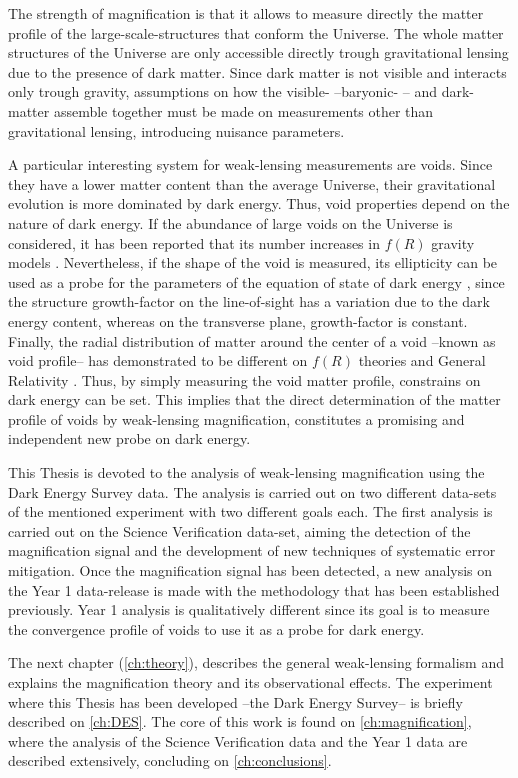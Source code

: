 The strength of magnification is that it allows to measure directly the matter profile of the large-scale-structures that conform the Universe. The whole matter structures of the Universe are only accessible directly trough gravitational lensing due to the presence of dark matter. Since dark matter is not visible and interacts only trough gravity, assumptions on how the visible- --baryonic- -- and dark- matter assemble together must be made on measurements other than gravitational lensing, introducing nuisance parameters.
\newline

A particular interesting system for weak-lensing measurements are voids. Since they have a lower matter content than the average Universe, their gravitational evolution is more dominated by dark energy. Thus, void properties depend on the nature of dark energy. If the abundance of large voids on the Universe is considered, it has been reported that its number increases in $f(R)$ gravity models \cite{2012MNRAS.421.3481L,2017JCAP...03..012V}. Nevertheless, if the shape of the void is measured, its ellipticity can be used as a probe for the parameters of the equation of state of dark energy \cite{2010MNRAS.403.1392L,0004-637X-754-2-109,PhysRevLett.98.081301,2013PhRvL.111x1103S}, since the structure growth-factor on the line-of-sight has a variation due to
the dark energy content, whereas on the transverse plane, growth-factor is constant. Finally, the radial distribution of matter around the center of a void --known as void profile-- has demonstrated to be different on $f(R)$ theories and General Relativity \cite{2014APh....54...44A,2014arXiv1410.8355C,2015MNRAS.451.4215Z,2015JCAP...08..028B,2016PhRvD..93j3522A,2016PhRvD..94j3524A}. Thus, by simply measuring the void matter profile, constrains on dark energy can be set. This implies that the direct determination of the matter profile of voids by weak-lensing magnification, constitutes a promising and independent new probe on dark energy.
\newline

This Thesis is devoted to the analysis of weak-lensing magnification using the Dark Energy Survey data. The analysis is carried out on two different data-sets of the mentioned experiment with two different goals each. The first analysis is carried out on the Science Verification data-set, aiming the detection of the magnification signal and the development of new techniques of systematic error mitigation. Once the magnification signal has been detected, a new analysis on the Year 1 data-release is made with the methodology that has been established previously. Year 1 analysis is qualitatively different since its goal is to measure the convergence profile of voids to use it as a probe for dark energy.
\newline

The next chapter (\autoref{ch:theory}), describes the general weak-lensing formalism and explains the magnification theory and its observational effects. The experiment where this Thesis has been developed --the Dark Energy Survey-- is briefly described on \autoref{ch:DES}. The core of this work is found on \autoref{ch:magnification}, where the analysis of the Science Verification data and the Year 1 data are described extensively, concluding on \autoref{ch:conclusions}.
